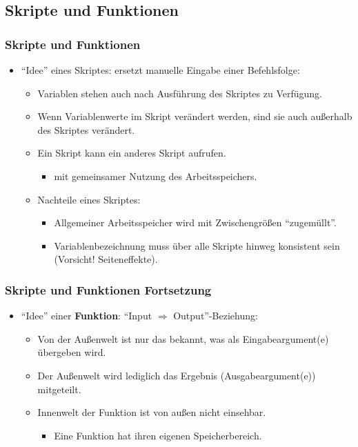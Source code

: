   \subsection{Skripte und Funktionen}
  \begin{frame}
      \frametitle{Skripte und Funktionen}
      \begin{itemize}
        \item ``Idee'' eines Skriptes: ersetzt manuelle Eingabe einer Befehlsfolge:
        \begin{itemize}
          \item Variablen stehen auch nach Ausführung des Skriptes zu Verfügung.
          \item Wenn Variablenwerte im Skript verändert werden, sind sie auch außerhalb des Skriptes verändert.
          \item Ein Skript kann ein anderes Skript aufrufen.
          \begin{itemize}
            \item mit gemeinsamer Nutzung des Arbeitsspeichers.
          \end{itemize}
          \item Nachteile eines Skriptes:
          \begin{itemize}
            \item Allgemeiner Arbeitsspeicher wird mit Zwischengrößen ``zugemüllt''.
            \item Variablenbezeichnung muss über alle Skripte hinweg konsistent sein (\alert{Vorsicht!} Seiteneffekte).
          \end{itemize}
        \end{itemize}
      \end{itemize}
  \end{frame}

  \begin{frame}
      \frametitle{Skripte und Funktionen Fortsetzung}
      \begin{itemize}
        \item ``Idee'' einer \textbf{Funktion}: ``Input $\Rightarrow$ Output''-Beziehung:
        \begin{itemize}
          \item Von der Außenwelt ist nur das bekannt, was als Eingabeargument(e) übergeben wird.
          \item Der Außenwelt wird lediglich das Ergebnis (Ausgabeargument(e)) mitgeteilt.
          \item Innenwelt der Funktion ist von außen nicht einsehbar.
          \begin{itemize}
            \item Eine Funktion hat ihren eigenen Speicherbereich.
          \end{itemize}
        \end{itemize}
      \end{itemize}
  \end{frame}

